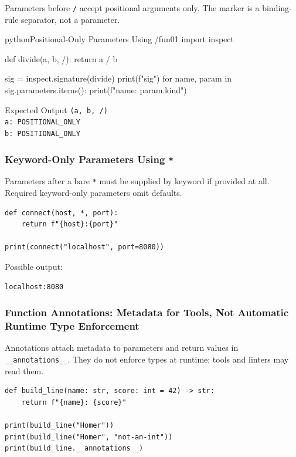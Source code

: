 \documentclass[a4paper,twoside]{report}
\begin{document}
Parameters before \texttt{/} accept positional arguments only. The marker is a binding-rule separator, not a parameter.

\begin{codebox}[]{python}{Positional-Only Parameters Using /}{fun01}
import inspect

def divide(a, b, /):
    return a / b

sig = inspect.signature(divide)
print(f"{sig}")
for name, param in sig.parameters.items():
    print(f"{name}: {param.kind}")
\end{codebox}


\begin{iobox}{Expected Output}
\texttt{(a, b, /)} \\
\texttt{a: POSITIONAL\_ONLY} \\
\texttt{b: POSITIONAL\_ONLY} \\
\end{iobox}




\subsubsection{Keyword-Only Parameters Using \texttt{*}}

Parameters after a bare \texttt{*} must be supplied by keyword if provided at all. Required keyword-only parameters omit defaults.

\begin{verbatim}
def connect(host, *, port):
    return f"{host}:{port}"

print(connect("localhost", port=8080))
\end{verbatim}

Possible output:

\begin{verbatim}
localhost:8080
\end{verbatim}

\subsubsection{Function Annotations: Metadata for Tools, Not Automatic Runtime Type Enforcement}

Annotations attach metadata to parameters and return values in \texttt{\_\_annotations\_\_}. They do not enforce types at runtime; tools and linters may read them.

\begin{verbatim}
def build_line(name: str, score: int = 42) -> str:
    return f"{name}: {score}"

print(build_line("Homer"))
print(build_line("Homer", "not-an-int"))
print(build_line.__annotations__)
\end{verbatim}
\end{document}
